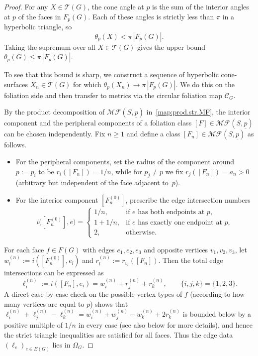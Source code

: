 \documentclass[11pt, letterpaper]{amsart}
\theoremstyle{definition}
\theoremstyle{remark}
\newcommand{\up}{\underline{p}}
\newcommand{\cMFp}{\mathcal{MF} (S,\up)}
\newcommand{\cC}{\mathcal{C}}
\newcommand{\cT}{\mathcal{T}}
\numberwithin{equation}{section}
\begin{document}
\begin{proof}
For any \(X\in\cT(G)\), the cone angle at \(p\) is the sum of the interior
angles at \(p\) of the faces in \(F_p(G)\).
Each of these angles is strictly less than \(\pi\) in a hyperbolic triangle,
so
\[
\theta_p(X)<\pi\,|F_p(G)|.
\]
Taking the supremum over all \(X\in\cT(G)\) gives the upper bound
\(\theta_p(G)\leq \pi\,|F_p(G)|\).

To see that this bound is sharp, we construct a sequence of hyperbolic
cone-surfaces \(X_n\in\cT(G)\) for which \(\theta_p(X_n)\to\pi\,|F_p(G)|\).
We do this on the foliation side and then transfer to metrics via the
circular foliation map \(\cC_G\).

By the product decomposition of \(\cMFp\) in~\eqref{map:prod.str.MF}, the
interior component and the peripheral components of a foliation class
\([F]\in\cMFp\) can be chosen independently.
Fix \(n\ge1\) and define a class \([F_n]\in\cMFp\) as follows.

\begin{itemize}
  \item For the peripheral components, set the radius of the component
  around \(p:=p_i\) to be \(r_i([F_n])=1/n\), while for \(p_j\neq p\) we fix
  \(r_j([F_n])=a_n>0\) (arbitrary but independent of the face adjacent to~\(p\)).

  \item For the interior component \([F_n^{(0)}]\), prescribe the edge
  intersection numbers
  \[
  i\big([F^{(0)}_n],e\big)
  =
  \begin{cases}
    1/n,&\text{if \(e\) has both endpoints at \(p\)},\\[0.2em]
    1+1/n,&\text{if \(e\) has exactly one endpoint at \(p\)},\\[0.2em]
    2,&\text{otherwise.}
  \end{cases}
  \]
\end{itemize}

For each face \(f\in F(G)\) with edges \(e_1,e_2,e_3\) and opposite vertices \(v_1,v_2,v_3\), let \(w_l^{(n)}:=i([F^{(0)}_n],e_l)\) and \(r_l^{(n)}:=r_{v_l}([F_n])\). 
Then the total edge intersections can be expressed as
\[
\ell_i^{(n)}:=i([F_n],e_i)=w_i^{(n)}+r_j^{(n)}+r_k^{(n)},\qquad\{i,j,k\}=\{1,2,3\}.
\]
A direct case-by-case check on the possible vertex types of \(f\)
(according to how many vertices are equal to \(p\)) shows that
\(\ell_i^{(n)}+\ell_j^{(n)}-\ell_k^{(n)} = w_i^{(n)}+w_j^{(n)}-w_k^{(n)}+2r_k^{(n)}\) is bounded below by a positive multiple of \(1/n\) in every case (see also below for more details), and hence the strict triangle
inequalities are satisfied for all faces.
Thus the edge data \((\ell_e)_{e\in E(G)}\) lies in \(\Omega_G\).


\end{proof}
\end{document}
